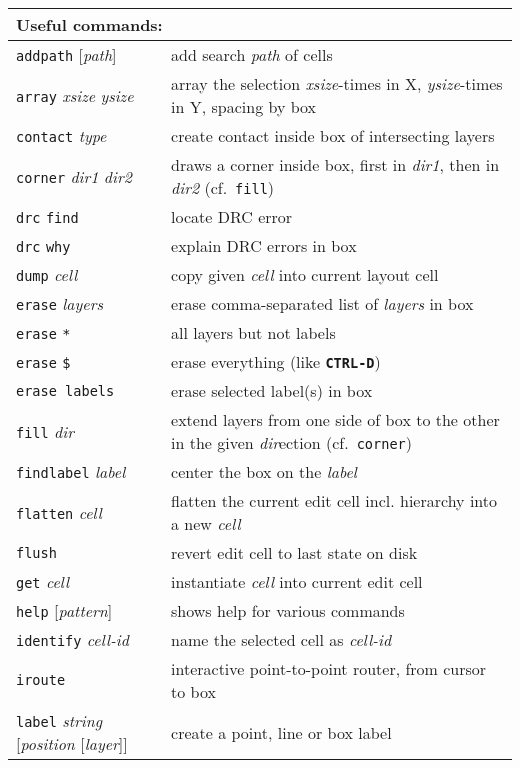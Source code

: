 \documentclass[10pt,a4paper]{article}
\newcommand{\key}[1]{\texttt{\textbf{#1}}}
\newcommand{\mac}[1]{\texttt{#1}}
\newcommand{\argu}[1]{\textit{#1}}
\begin{document}
	\begin{tabular}{p{}p{}}
		\toprule
		\multicolumn{2}{l}{Useful commands:}\\
		\midrule
		\mac{addpath} [\argu{path}] & add search \argu{path} of cells\\
		\mac{array} \argu{xsize} \argu{ysize} & array the selection \argu{xsize}-times in X, \argu{ysize}-times in Y, spacing by box\\
		\mac{contact} \argu{type} & create contact inside box of intersecting layers\\
		\mac{corner} \argu{dir1} \argu{dir2} & draws a corner inside box, first in \argu{dir1}, then in \argu{dir2} (cf.~\mac{fill})\\
		\mac{drc} \mac{find} & locate DRC error\\
		\mac{drc} \mac{why} & explain DRC errors in box\\
		\mac{dump} \argu{cell} & copy given \argu{cell} into current layout cell\\
		\mac{erase} \argu{layers} & erase comma-separated list of \argu{layers} in box\\
		\mac{erase} \mac{*} & all layers but not labels\\
		\mac{erase} \mac{\$} & erase everything (like \key{CTRL-D})\\
		\mac{erase labels} & erase selected label(s) in box\\
		\mac{fill} \argu{dir} & extend layers from one side of box to the other in the given \argu{dir}ection (cf.~\mac{corner})\\
		\mac{findlabel} \argu{label} & center the box on the \argu{label}\\
		\mac{flatten} \argu{cell} & flatten the current edit cell incl. hierarchy into a new \argu{cell}\\
		\mac{flush} & revert edit cell to last state on disk\\
		\mac{get} \argu{cell} & instantiate \argu{cell} into current edit cell\\
		\mac{help} [\argu{pattern}] & shows help for various commands\\
		\mac{identify} \argu{cell-id} & name the selected cell as \argu{cell-id}\\
		\mac{iroute} & interactive point-to-point router, from cursor to box\\
		\mac{label} \argu{string} [\argu{position} [\argu{layer}]] & create a point, line or box label\\

\end{tabular}
\end{document}
